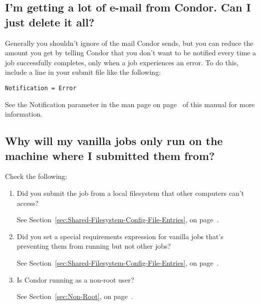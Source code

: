 \subsection*{I'm getting a lot of e-mail from Condor.  Can I just delete it all?}

Generally you shouldn't ignore  of the mail Condor sends,
but you can reduce the amount you get by telling Condor that you don't
want to be notified every time a job successfully completes, only when
a job experiences an error.
To do this, include a line in your submit file like the following:

\begin{verbatim}Notification = Error\end{verbatim}

See the Notification parameter in the  man page on
page~\pageref{man-condor-submit-notification} of this manual for more
information.

\subsection*{Why will my vanilla jobs only run on the machine where I submitted them from?}

Check the following:
\begin {enumerate}

\item{Did you submit the job from a local filesystem that other
computers can't access?}

See Section~\ref{sec:Shared-Filesystem-Config-File-Entries}, on
page~\pageref{sec:Shared-Filesystem-Config-File-Entries}.

\item{Did you set a special requirements expression for 
vanilla jobs that's preventing them from running but not other jobs?}

See Section~\ref{sec:Shared-Filesystem-Config-File-Entries}, on
page~\pageref{sec:Shared-Filesystem-Config-File-Entries}.

\item{Is Condor running as a non-root user?}

See Section~\ref{sec:Non-Root}, on page~\pageref{sec:Non-Root}.

\end{enumerate}

